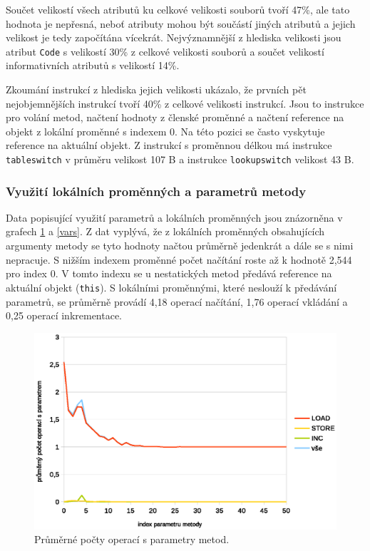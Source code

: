Součet velikostí všech atributů ku celkové velikosti souborů tvoří 47\%, ale tato hodnota je nepřesná, neboť atributy mohou být součástí jiných atributů a jejich velikost je tedy započítána vícekrát. Nejvýznamnější z hlediska velikosti jsou atribut \texttt{Code} s velikostí 30\% z celkové velikosti souborů a součet velikostí informativních atributů s velikostí 14\%.

Zkoumání instrukcí z hlediska jejich velikosti ukázalo, že prvních pět nejobjemnějších instrukcí tvoří 40\% z celkové velikosti instrukcí. Jsou to instrukce pro volání metod, načtení hodnoty z členské proměnné a načtení reference na objekt z lokální proměnné s indexem 0. Na této pozici se často vyskytuje reference na aktuální objekt. Z instrukcí s proměnnou délkou má instrukce \texttt{tableswitch} v průměru velikost 107 B a instrukce \texttt{lookupswitch} velikost 43 B.


\subsubsection{Využití lokálních proměnných a parametrů metody}

Data popisující využití parametrů a lokálních proměnných jsou znázorněna v grafech \ref{params} a \ref{vars}. Z dat vyplývá, že z lokálních proměnných obsahujících argumenty metody se tyto hodnoty načtou průměrně jedenkrát a dále se s nimi nepracuje. S nižším indexem proměnné počet načítání roste až k hodnotě 2,544 pro index 0. V tomto indexu se u nestatických metod předává reference na aktuální objekt (\texttt{this}). S lokálními proměnnými, které neslouží k předávání parametrů, se průměrně provádí 4,18 operací načítání, 1,76 operací vkládání a 0,25 operací inkrementace.

\begin{figure}[h!]
\centering
\includegraphics[scale=0.9]{fig/params}
\caption{Průměrné počty operací s parametry metod.}\label{params}
\end{figure}

